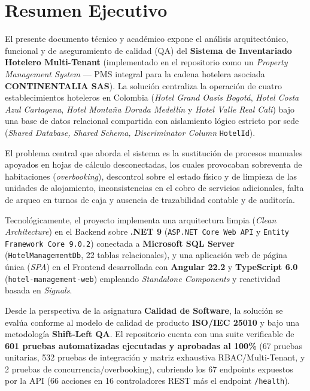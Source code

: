 \documentclass[12pt,a4paper]{article}
\begin{document}
\justifying

\section{Resumen Ejecutivo}

El presente documento t\'ecnico y acad\'emico expone el an\'alisis arquitect\'onico, funcional y de aseguramiento de calidad (QA) del \textbf{Sistema de Inventariado Hotelero Multi-Tenant} (implementado en el repositorio como un \textit{Property Management System} --- PMS integral para la cadena hotelera asociada \textbf{CONTINENTALIA SAS}). La soluci\'on centraliza la operaci\'on de cuatro establecimientos hoteleros en Colombia (\textit{Hotel Grand Oasis Bogot\'a}, \textit{Hotel Costa Azul Cartagena}, \textit{Hotel Monta\~na Dorada Medell\'in} y \textit{Hotel Valle Real Cali}) bajo una base de datos relacional compartida con aislamiento l\'ogico estricto por sede (\textit{Shared Database, Shared Schema, Discriminator Column} \texttt{HotelId}).

El problema central que aborda el sistema es la sustituci\'on de procesos manuales apoyados en hojas de c\'alculo desconectadas, los cuales provocaban sobreventa de habitaciones (\textit{overbooking}), descontrol sobre el estado f\'isico y de limpieza de las unidades de alojamiento, inconsistencias en el cobro de servicios adicionales, falta de arqueo en turnos de caja y ausencia de trazabilidad contable y de auditor\'ia.

Tecnol\'ogicamente, el proyecto implementa una arquitectura limpia (\textit{Clean Architecture}) en el Backend sobre \textbf{.NET 9} (\texttt{ASP.NET Core Web API} y \texttt{Entity Framework Core 9.0.2}) conectada a \textbf{Microsoft SQL Server} (\texttt{HotelManagementDb}, 22 tablas relacionales), y una aplicaci\'on web de p\'agina \'unica (\textit{SPA}) en el Frontend desarrollada con \textbf{Angular 22.2} y \textbf{TypeScript 6.0} (\texttt{hotel-management-web}) empleando \textit{Standalone Components} y reactividad basada en \textit{Signals}.

Desde la perspectiva de la asignatura \textbf{Calidad de Software}, la soluci\'on se eval\'ua conforme al modelo de calidad de producto \textbf{ISO/IEC 25010} y bajo una metodolog\'ia \textbf{Shift-Left QA}. El repositorio cuenta con una suite verificable de \textbf{601 pruebas automatizadas ejecutadas y aprobadas al 100\%} (67 pruebas unitarias, 532 pruebas de integraci\'on y matriz exhaustiva RBAC/Multi-Tenant, y 2 pruebas de concurrencia/overbooking), cubriendo los 67 endpoints expuestos por la API (66 acciones en 16 controladores REST m\'as el endpoint \texttt{/health}).
\end{document}
